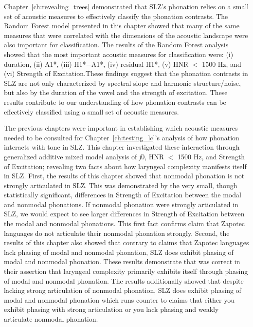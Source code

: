 Chapter~\ref{ch:revealing_trees} demonstrated that SLZ's phonation relies on a small set of acoustic measures to effectively classify the phonation contrasts. The Random Forest model presented in this chapter showed that many of the same measures that were correlated with the dimensions of the acoustic landscape were also important for classification. The results of the Random Forest analysis showed that the most important acoustic measures for classification were: (i) duration, (ii) A1*, (iii) H1*$-$A1*, (iv) residual H1*, (v) HNR $<$ 1500 Hz, and (vi) Strength of Excitation.These findings suggest that the phonation contrasts in SLZ are not only characterized by spectral slope and harmonic structure/noise, but also by the duration of the vowel and the strength of excitation. These results contribute to our understanding of how phonation contrasts can be effectively classified using a small set of acoustic measures.

The previous chapters were important in establishing which acoustic measures needed to be consulted for Chapter~\ref{ch:testing_lc}'s analysis of how phonation interacts with tone in SLZ. This chapter investigated these interaction through generalized additive mixed model analysis of \textit{f}0, HNR $<$ 1500 Hz, and Strength of Excitation; revealing two facts about how laryngeal complexity manifests itself in SLZ. First, the results of this chapter showed that nonmodal phonation is not strongly articulated in SLZ. This was demonstrated by the very small, though statistically significant, differences in Strength of Excitation between the modal and nonmodal phonations. If nonmodal phonation were strongly articulated in SLZ, we would expect to see larger differences in Strength of Excitation between the modal and nonmodal phonations. This first fact confirms  claim that Zapotec languages do not articulate their nonmodal phonation strongly. Second, the results of this chapter also showed that contrary to  claims that Zapotec languages lack phasing of modal and nonmodal phonation, SLZ does exhibit phasing of modal and nonmodal phonation. These results demonstrate that \citet{silvermanLaryngealComplexityOtomanguean1997,silvermanPhasingRecoverability1997} was correct in their assertion that laryngeal complexity primarily exhibits itself through phasing of modal and nonmodal phonation. The results additionally showed that despite lacking strong articulation of nonmodal phonation, SLZ does exhibit phasing of modal and nonmodal phonation which runs counter to  claims that either you exhibit phasing with strong articulation or you lack phasing and weakly articulate nonmodal phonation.

